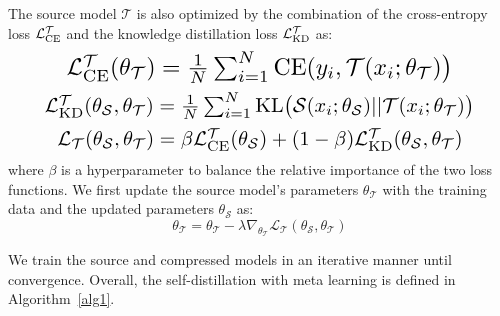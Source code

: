 \documentclass[11pt]{article}
\begin{document}
The source model $\mathcal{T}$ is also optimized by the combination of the cross-entropy loss $\mathcal{L}^{\mathcal{T}}_{\rm CE}$ and the knowledge distillation loss $\mathcal{L}^{\mathcal{T}}_{\rm KD}$ as:
\begin{equation}
\label{equation:theta-T-update}
\resizebox{0.8 \hsize}{!}{$ \mathcal{L}^{\mathcal{T}}_{\rm CE}(\theta_{\mathcal{T}}) = \frac{1}{N}\sum_{i=1}^{N}{\rm CE}(y_i, \mathcal{T}(x_i; \theta_{\mathcal{T}})\big) $}
\end{equation}
\vspace{-0.4cm}
\begin{equation}
\resizebox{0.89 \hsize}{!}{$\mathcal{L}^{\mathcal{T}}_{\rm KD}(\theta_{\mathcal{S}},\theta_{\mathcal{T}})= \frac{1}{N}\sum_{i=1}^{N}{\rm KL}\big(\mathcal{S}(x_i; \theta_{\mathcal{S}})||\mathcal{T}(x_i; \theta_{\mathcal{T}})\big) $}
\end{equation}
\vspace{-0.4cm}
\begin{equation}
\resizebox{0.84 \hsize}{!}{$\mathcal{L}_{\mathcal{T}}(\theta_{\mathcal{S}},\theta_{\mathcal{T}})= \beta \mathcal{L}^{\mathcal{T}}_{\rm CE}(\theta_{\mathcal{S}}) + (1-\beta) \mathcal{L}^{\mathcal{T}}_{\rm KD}(\theta_{\mathcal{S}},\theta_{\mathcal{T}}) $}
\end{equation}
where $\beta$ is a hyperparameter to balance the relative importance of the two loss functions. We first update the source model's parameters $\theta_{\mathcal{T}}$ with the training data and the updated parameters $\theta_{\mathcal{S}}$ as:
\begin{equation}
\theta_{\mathcal{T}} = \theta_{\mathcal{T}} - \lambda \nabla_{\theta_{\mathcal{T}}} \mathcal{L}_{\mathcal{T}}(\theta_{\mathcal{S}},\theta_{\mathcal{T}})
\label{eq:sgd-T}
\end{equation}

We train the source and compressed models in an iterative manner until convergence. 
Overall, the self-distillation with meta learning is defined in Algorithm~\ref{alg1}.
\end{document}
